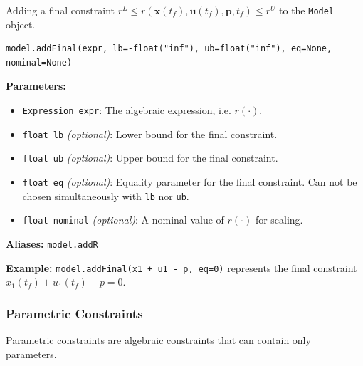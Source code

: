 \documentclass[12pt]{article}
\renewcommand{\v}{\bm}
\begin{document}
	\begin{mdframed}[backgroundcolor=gray!10, roundcorner=10pt, linewidth=1pt]
		
		Adding a final constraint ${r}^{L} \leq {r}(\v{x}(t_f), \v{u}(t_f), \v{p}, t_f) \leq {r}^{U}$ to the \texttt{Model} object.
		
		\begin{lstlisting}
model.addFinal(expr, lb=-float("inf"), ub=float("inf"), eq=None, nominal=None)
		\end{lstlisting}
		\label{addFinal}
		\textbf{Parameters:}
		\begin{itemize}
			\item \texttt{Expression expr}: The algebraic expression, i.e. $r(\cdot)$.
			\item \texttt{float lb} \emph{(optional)}: Lower bound for the final constraint.
			\item \texttt{float ub} \emph{(optional)}: Upper bound for the final constraint.
			\item \texttt{float eq} \emph{(optional)}: Equality parameter for the final constraint. Can not be chosen simultaneously with \texttt{lb} nor \texttt{ub}.
			\item \texttt{float nominal} \emph{(optional)}: A nominal value of $r(\cdot)$ for scaling.
		\end{itemize}
		
		\textbf{Aliases:}  \texttt{model.addR}
		
		\textbf{Example:} \texttt{model.addFinal(x1 + u1 - p, eq=0)} represents the final constraint
		$x_1(t_f) + u_1(t_f) - p = 0$.
	\end{mdframed}
	
	\subsubsection{Parametric Constraints}
	
		Parametric constraints are algebraic constraints that can contain only parameters.
		
\end{document}
